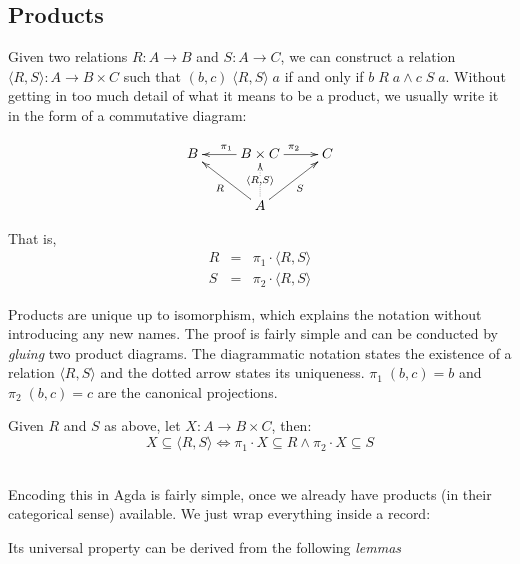 

\subsection{Products}

Given two relations $R : A \rightarrow B$ and $S : A \rightarrow C$, we can construct a relation
$\langle R , S \rangle : A \rightarrow B \times C$ such that $(b,c)\;\langle R , S \rangle\;a$ if and only if $b\;R\;a \wedge c\;S\;a$.
Without getting in too much detail of what it means to be a product, we usually write
it in the form of a commutative diagram:

\begin{displaymath}
\xymatrix{%
B & B \times C \ar[l]_{\pi_1} \ar[r]^{\pi_2} & C \\
  &     A \ar@{..>}[u]|{\langle R , S \rangle} \ar[ul]^{R} \ar[ur]_{S}
  &
}
\end{displaymath} 

That is,
\begin{eqnarray*}
  R &=& \pi_1 \cdot \langle R , S \rangle \\
  S &=& \pi_2 \cdot \langle R , S \rangle
\end{eqnarray*}

Products are unique up to isomorphism, which explains the notation without introducing any new names.
The proof is fairly simple and can be conducted by \emph{gluing} two product diagrams.
The diagrammatic notation states the existence of a relation $\langle R , S \rangle$ and the dotted arrow
states its uniqueness. $\pi_1\;(b , c) = b$ and $\pi_2\;(b , c) = c$ are the canonical
projections.\\

\begin{mydef}
Given $R$ and $S$ as above, let $X : A \rightarrow B \times C$, then:
\[
  X \subseteq \langle R , S \rangle \Leftrightarrow \pi_1 \cdot X \subseteq R \wedge \pi_2 \cdot X \subseteq S
\]\\
\end{mydef}
Encoding this in Agda is fairly simple, once we already have products (in their categorical sense)
available. We just wrap everything inside a record:


Its universal property can be derived from the following \emph{lemmas}

\\
\\

